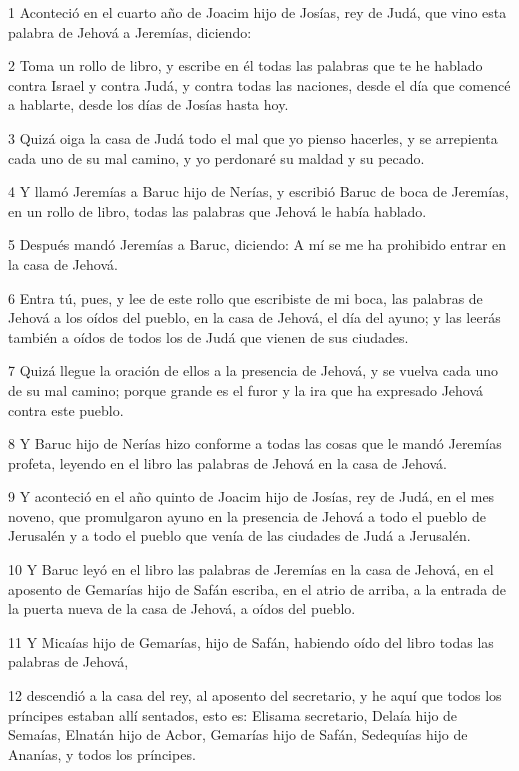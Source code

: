 \par 1 Aconteció en el cuarto año de Joacim hijo de Josías, rey de Judá, que vino esta palabra de Jehová a Jeremías, diciendo:
\par 2 Toma un rollo de libro, y escribe en él todas las palabras que te he hablado contra Israel y contra Judá, y contra todas las naciones, desde el día que comencé a hablarte, desde los días de Josías hasta hoy.
\par 3 Quizá oiga la casa de Judá todo el mal que yo pienso hacerles, y se arrepienta cada uno de su mal camino, y yo perdonaré su maldad y su pecado.
\par 4 Y llamó Jeremías a Baruc hijo de Nerías, y escribió Baruc de boca de Jeremías, en un rollo de libro, todas las palabras que Jehová le había hablado.
\par 5 Después mandó Jeremías a Baruc, diciendo: A mí se me ha prohibido entrar en la casa de Jehová.
\par 6 Entra tú, pues, y lee de este rollo que escribiste de mi boca, las palabras de Jehová a los oídos del pueblo, en la casa de Jehová, el día del ayuno; y las leerás también a oídos de todos los de Judá que vienen de sus ciudades.
\par 7 Quizá llegue la oración de ellos a la presencia de Jehová, y se vuelva cada uno de su mal camino; porque grande es el furor y la ira que ha expresado Jehová contra este pueblo.
\par 8 Y Baruc hijo de Nerías hizo conforme a todas las cosas que le mandó Jeremías profeta, leyendo en el libro las palabras de Jehová en la casa de Jehová.
\par 9 Y aconteció en el año quinto de Joacim hijo de Josías, rey de Judá, en el mes noveno, que promulgaron ayuno en la presencia de Jehová a todo el pueblo de Jerusalén y a todo el pueblo que venía de las ciudades de Judá a Jerusalén.
\par 10 Y Baruc leyó en el libro las palabras de Jeremías en la casa de Jehová, en el aposento de Gemarías hijo de Safán escriba, en el atrio de arriba, a la entrada de la puerta nueva de la casa de Jehová, a oídos del pueblo.
\par 11 Y Micaías hijo de Gemarías, hijo de Safán, habiendo oído del libro todas las palabras de Jehová,
\par 12 descendió a la casa del rey, al aposento del secretario, y he aquí que todos los príncipes estaban allí sentados, esto es: Elisama secretario, Delaía hijo de Semaías, Elnatán hijo de Acbor, Gemarías hijo de Safán, Sedequías hijo de Ananías, y todos los príncipes.
